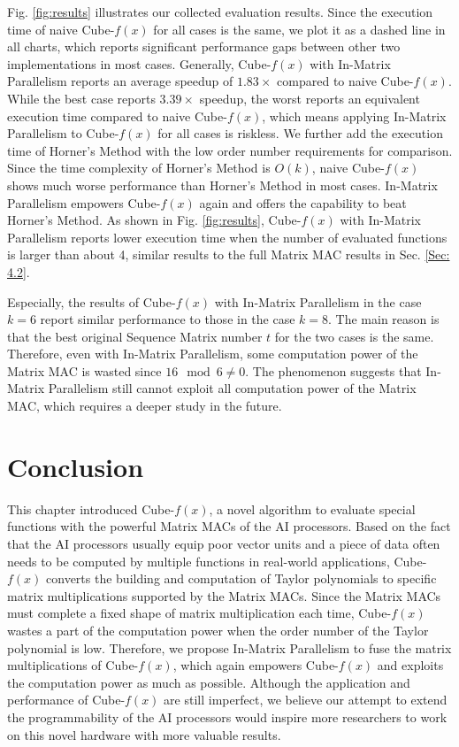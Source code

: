 \documentclass[12pt]{extbook}
\begin{document}
Fig. \ref{fig:results} illustrates our collected evaluation results. Since the execution time of naive Cube-$f(x)$ for all cases is the same, we plot it as a dashed line in all charts, which reports significant performance gaps between other two implementations in most cases. Generally, Cube-$f(x)$ with In-Matrix Parallelism reports an average speedup of $1.83\times$ compared to naive Cube-$f(x)$. While the best case reports $3.39\times$ speedup, the worst reports an equivalent execution time compared to naive Cube-$f(x)$, which means applying In-Matrix Parallelism to Cube-$f(x)$ for all cases is riskless. We further add the execution time of Horner's Method with the low order number requirements for comparison. Since the time complexity of Horner's Method is $O(k)$, naive Cube-$f(x)$ shows much worse performance than Horner's Method in most cases. In-Matrix Parallelism empowers Cube-$f(x)$ again and offers the capability to beat Horner's Method. As shown in Fig. \ref{fig:results}, Cube-$f(x)$ with In-Matrix Parallelism reports lower execution time when the number of evaluated functions is larger than about 4, similar results to the full Matrix MAC results in Sec. \ref{Sec: 4.2}. 

Especially, the results of Cube-$f(x)$ with In-Matrix Parallelism in the case $k = 6$ report similar performance to those in the case $k = 8$. The main reason is that the best original Sequence Matrix number $t$ for the two cases is the same. Therefore, even with In-Matrix Parallelism, some computation power of the Matrix MAC is wasted since $16 \mod 6 \neq 0$. The phenomenon suggests that In-Matrix Parallelism still cannot exploit all computation power of the Matrix MAC, which requires a deeper study in the future.

\section{Conclusion \label{sec:8}}

This chapter introduced Cube-$f(x)$, a novel algorithm to evaluate special functions with the powerful Matrix MACs of the AI processors. Based on the fact that the AI processors usually equip poor vector units and a piece of data often needs to be computed by multiple functions in real-world applications, Cube-$f(x)$ converts the building and computation of Taylor polynomials to specific matrix multiplications supported by the Matrix MACs. Since the Matrix MACs must complete a fixed shape of matrix multiplication each time, Cube-$f(x)$ wastes a part of the computation power when the order number of the Taylor polynomial is low. Therefore, we propose In-Matrix Parallelism to fuse the matrix multiplications of Cube-$f(x)$, which again empowers Cube-$f(x)$ and exploits the computation power as much as possible. Although the application and performance of Cube-$f(x)$ are still imperfect, we believe our attempt to extend the programmability of the AI processors would inspire more researchers to work on this novel hardware with more valuable results.
\end{document}
